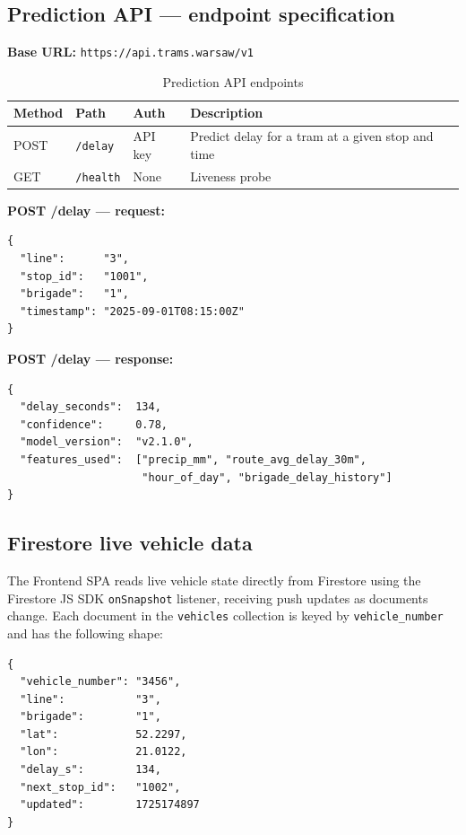 \documentclass[11pt,a4paper]{article}
\newcommand{\hd}[1]{\textbf{\small #1}}
\begin{document}
\subsection{Prediction API --- endpoint specification}

\textbf{Base URL:} \texttt{https://api.trams.warsaw/v1}

\begin{table}[H]
\centering
\caption{Prediction API endpoints}
\renewcommand{\arraystretch}{1.38}
\begin{tabularx}{\linewidth}{L{1.2cm} L{4.6cm} L{2.2cm} X}
\toprule
\hd{Method} & \hd{Path} & \hd{Auth} & \hd{Description} \\
\midrule
{}
POST & \texttt{/delay} & API key
  & Predict delay for a tram at a given stop and time \\
GET  & \texttt{/health} & None & Liveness probe \\
\bottomrule
\end{tabularx}
\end{table}

\textbf{POST /delay --- request:}
\begin{verbatim}
{
  "line":      "3",
  "stop_id":   "1001",
  "brigade":   "1",
  "timestamp": "2025-09-01T08:15:00Z"
}
\end{verbatim}

\textbf{POST /delay --- response:}
\begin{verbatim}
{
  "delay_seconds":  134,
  "confidence":     0.78,
  "model_version":  "v2.1.0",
  "features_used":  ["precip_mm", "route_avg_delay_30m",
                     "hour_of_day", "brigade_delay_history"]
}
\end{verbatim}

\subsection{Firestore live vehicle data}

The Frontend SPA reads live vehicle state directly from Firestore using the
Firestore JS SDK \texttt{onSnapshot} listener, receiving push updates as
documents change. Each document in the \texttt{vehicles} collection is keyed
by \texttt{vehicle\_number} and has the following shape:

\begin{verbatim}
{
  "vehicle_number": "3456",
  "line":           "3",
  "brigade":        "1",
  "lat":            52.2297,
  "lon":            21.0122,
  "delay_s":        134,
  "next_stop_id":   "1002",
  "updated":        1725174897
}
\end{verbatim}
\end{document}
